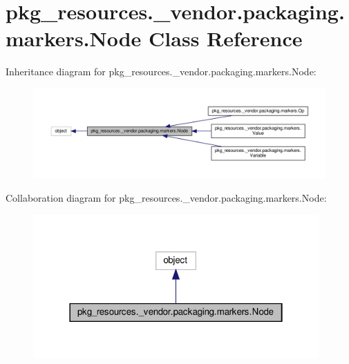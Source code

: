 \hypertarget{classpkg__resources_1_1__vendor_1_1packaging_1_1markers_1_1Node}{}\section{pkg\+\_\+resources.\+\_\+vendor.\+packaging.\+markers.\+Node Class Reference}
\label{classpkg__resources_1_1__vendor_1_1packaging_1_1markers_1_1Node}


Inheritance diagram for pkg\+\_\+resources.\+\_\+vendor.\+packaging.\+markers.\+Node\+:
\nopagebreak
\begin{figure}[H]
\begin{center}
\leavevmode
\includegraphics[width=350pt]{classpkg__resources_1_1__vendor_1_1packaging_1_1markers_1_1Node__inherit__graph}
\end{center}
\end{figure}


Collaboration diagram for pkg\+\_\+resources.\+\_\+vendor.\+packaging.\+markers.\+Node\+:
\nopagebreak
\begin{figure}[H]
\begin{center}
\leavevmode
\includegraphics[width=310pt]{classpkg__resources_1_1__vendor_1_1packaging_1_1markers_1_1Node__coll__graph}
\end{center}
\end{figure}
